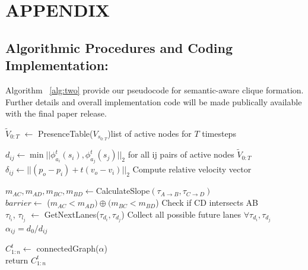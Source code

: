 \documentclass{article}
\begin{document}

\vspace{80pt}
\section{APPENDIX}
\subsection{Algorithmic Procedures and Coding Implementation:} Algorithm ~\ref{alg:two} provide our pseudocode for semantic-aware clique formation. Further details and overall implementation code will be made publically available with the final paper release. 
\begin{algorithm}[hbt!]
\caption{Semantic-aware clique formation }\label{alg:two}

{$\tilde{V}_{0:T}$ $\leftarrow$ PresenceTable($V_{s_{0:T}}$)\Comment list of active nodes for $T$ timesteps\\} 
{
$d_{ij}\leftarrow \min ||\phi_{a_i}^t(s_i), \phi_{a_j}^t(s_j)||_2$ \Comment for all ij pairs of active nodes $\tilde V_{0:T}$\\
$\delta_{ij}\leftarrow ||(p_o - p_i) + t (v_o - v_i)||_2 $ \Comment Compute relative velocity vector\\
{

$m_{AC},m_{AD},m_{BC},m_{BD} \leftarrow $CalculateSlope$(\tau_{A\rightarrow{B}}, \tau_{C \rightarrow{D}})$\\
$barrier \leftarrow$ ($m_{AC}<m_{AD}) \oplus (m_{BC} < m_{BD}$) \Comment Check if CD intersects AB\\
{
$\tau_{l_i}$, $\tau_{l_j}$ $\leftarrow$ GetNextLanes($\tau_{d_i},\tau_{d_j}$) \Comment Collect all possible future lanes $\forall \tau_{d_i},\tau_{d_j}$\\
{
$\alpha_{ij} = d_0/d_{ij}$ 
}
}
}
$C^t_{1:n} \leftarrow$ connectedGraph($\alpha$) \\

return $C_{1:n}^t$

}

\end{algorithm}
\end{document}
